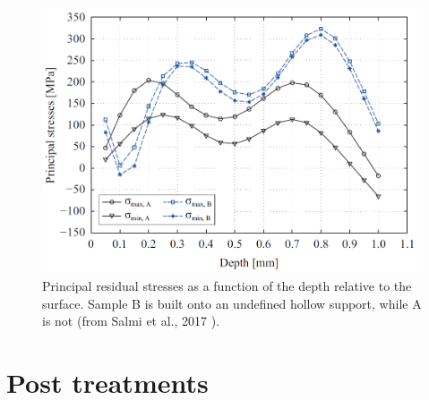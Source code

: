 \begin{figure}[ht]
	\centering
	\includegraphics[scale=0.50]{Images/Rs-support}
	\decoRule
	\caption[Principal residual stresses as a function of the depth relative to the surface. Sample B is built onto an undefined hollow support, while A is not]{Principal residual stresses as a function of the depth relative to the surface. Sample B is built onto an undefined hollow support, while A is not (from Salmi et al., 2017 \parencite{Salmi2017}).}
	\label{fig:rs_support}
\end{figure}

\section{Post treatments}
%
%
%
%
%
%
%
%

